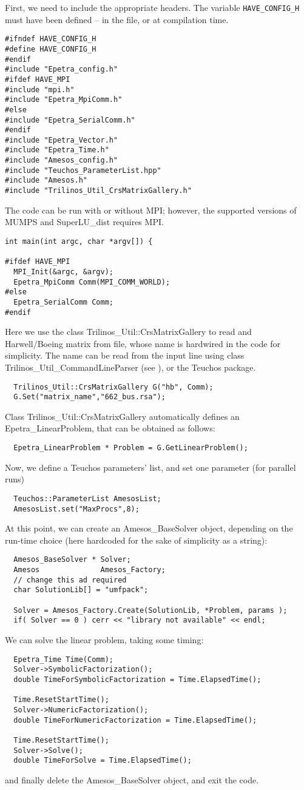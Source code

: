 \documentclass[11pt]{SANDreport}
\begin{document}
First, we need to include the appropriate headers. The variable
\verb!HAVE_CONFIG_H! must have been defined -- in the file, or at
compilation time. 
\begin{verbatim}
#ifndef HAVE_CONFIG_H
#define HAVE_CONFIG_H
#endif
#include "Epetra_config.h"
#ifdef HAVE_MPI
#include "mpi.h"
#include "Epetra_MpiComm.h"
#else
#include "Epetra_SerialComm.h"
#endif
#include "Epetra_Vector.h"
#include "Epetra_Time.h"
#include "Amesos_config.h"
#include "Teuchos_ParameterList.hpp"
#include "Amesos.h"
#include "Trilinos_Util_CrsMatrixGallery.h"
\end{verbatim}
The code can be run with or without MPI; however, the supported versions
of MUMPS and SuperLU\_dist requires MPI.
\begin{verbatim}
int main(int argc, char *argv[]) {

#ifdef HAVE_MPI
  MPI_Init(&argc, &argv);
  Epetra_MpiComm Comm(MPI_COMM_WORLD);
#else
  Epetra_SerialComm Comm;
#endif
\end{verbatim}
Here we use the class Trilinos\_Util::CrsMatrixGallery to read and
Harwell/Boeing matrix from file, whose name is hardwired in the code for
simplicity. The name can be read from the input line using class
Trilinos\_Util\_CommandLineParser (see \cite{Trilinos-tutorial}), or the
Teuchos package.
\begin{verbatim}
  Trilinos_Util::CrsMatrixGallery G("hb", Comm);
  G.Set("matrix_name","662_bus.rsa");
\end{verbatim}
Class Trilinos\_Util::CrsMatrixGallery automatically defines an
Epetra\_LinearProblem, that can be obtained as follows:
\begin{verbatim}  
  Epetra_LinearProblem * Problem = G.GetLinearProblem();
\end{verbatim}
Now, we define a Teuchos parameters' list, and set one parameter (for
parallel runs)
\begin{verbatim}  
  Teuchos::ParameterList AmesosList;
  AmesosList.set("MaxProcs",8);
\end{verbatim}
At this point, we can create an Amesos\_BaseSolver object, depending on
the run-time choice (here hardcoded for the sake of simplicity as a
string):
\begin{verbatim}  
  Amesos_BaseSolver * Solver;
  Amesos              Amesos_Factory;
  // change this ad required
  char SolutionLib[] = "umfpack";

  Solver = Amesos_Factory.Create(SolutionLib, *Problem, params );
  if( Solver == 0 ) cerr << "library not available" << endl;
\end{verbatim}
We can solve the linear problem, taking some timing:
\begin{verbatim}  
  Epetra_Time Time(Comm);      
  Solver->SymbolicFactorization();
  double TimeForSymbolicFactorization = Time.ElapsedTime();
  
  Time.ResetStartTime();  
  Solver->NumericFactorization();
  double TimeForNumericFactorization = Time.ElapsedTime();
   
  Time.ResetStartTime();
  Solver->Solve();
  double TimeForSolve = Time.ElapsedTime();
\end{verbatim}
and finally delete the Amesos\_BaseSolver object, and exit the code.
\end{document}
